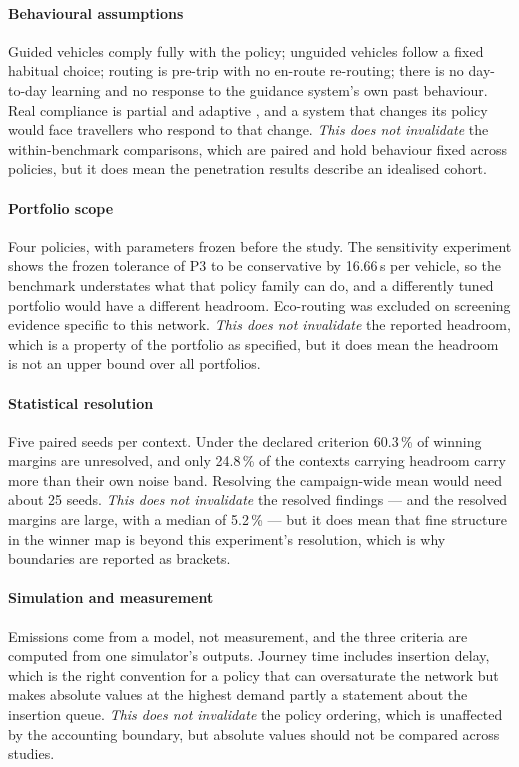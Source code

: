 \paragraph{Behavioural assumptions} Guided vehicles comply fully with the policy;
unguided vehicles follow a fixed habitual choice; routing is pre-trip with no
en-route re-routing; there is no day-to-day learning and no response to the
guidance system's own past behaviour. Real compliance is partial and
adaptive \citep{toso2024detrimental}, and a system that changes its policy would
face travellers who respond to that change. \emph{This does not invalidate} the
within-benchmark comparisons, which are paired and hold behaviour fixed across
policies, but it does mean the penetration results describe an idealised cohort.

\paragraph{Portfolio scope} Four policies, with parameters frozen before the
study. The sensitivity experiment shows the frozen tolerance of P3 to be
conservative by 16.66\,s per vehicle, so the benchmark understates what that
policy family can do, and a differently tuned portfolio would have a different
headroom. Eco-routing was excluded on screening evidence specific to this network.
\emph{This does not invalidate} the reported headroom, which is a property of the
portfolio as specified, but it does mean the headroom is not an upper bound over
all portfolios.

\paragraph{Statistical resolution} Five paired seeds per context. Under the
declared criterion 60.3\,\% of winning margins are unresolved, and only 24.8\,\% of
the contexts carrying headroom carry more than their own noise band. Resolving the
campaign-wide mean would need about 25 seeds. \emph{This does not invalidate} the
resolved findings --- and the resolved margins are large, with a median of 5.2\,\%
--- but it does mean that fine structure in the winner map is beyond this
experiment's resolution, which is why boundaries are reported as brackets.

\paragraph{Simulation and measurement} Emissions come from a model, not
measurement, and the three criteria are computed from one simulator's outputs.
Journey time includes insertion delay, which is the right convention for a policy
that can oversaturate the network but makes absolute values at the highest demand
partly a statement about the insertion queue. \emph{This does not invalidate} the
policy ordering, which is unaffected by the accounting boundary, but absolute
values should not be compared across studies.

